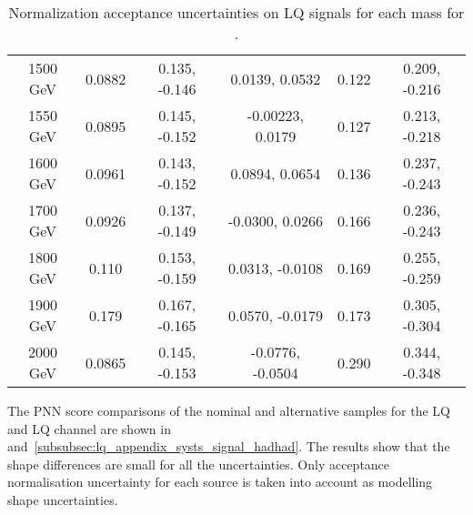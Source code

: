 \begin{table}
\begin{tabular}{|c|c|c|c|c|c|}
1500 GeV & 0.0882 & 0.135, -0.146  &   0.0139,   0.0532 &  0.122 & 0.209, -0.216 \\
1550 GeV & 0.0895 & 0.145, -0.152  & -0.00223,   0.0179 &  0.127 & 0.213, -0.218 \\
1600 GeV & 0.0961 & 0.143, -0.152  &   0.0894,   0.0654 &  0.136 & 0.237, -0.243 \\
1700 GeV & 0.0926 & 0.137, -0.149  &  -0.0300,   0.0266 &  0.166 & 0.236, -0.243 \\
1800 GeV &  0.110 & 0.153, -0.159  &   0.0313,  -0.0108 &  0.169 & 0.255, -0.259 \\
1900 GeV &  0.179 & 0.167, -0.165  &   0.0570,  -0.0179 &  0.173 & 0.305, -0.304 \\
2000 GeV & 0.0865 & 0.145, -0.153  &  -0.0776,  -0.0504 &  0.290 & 0.344, -0.348 \\
\hline
\end{tabular}
\caption{Normalization acceptance uncertainties on LQ signals for each mass for \hadhad.}
\label{sec:systs:tab:systematics_normalisations_LQ_hadhad}
\end{table}

The PNN score comparisons of the nominal and alternative samples for the LQ \lephad and LQ \hadhad channel are shown in~ and~\ref{subsubsec:lq_appendix_systs_signal_hadhad}.
The results show that the shape differences are small for all the uncertainties.
Only acceptance normalisation uncertainty for each source is taken into account as modelling shape uncertainties.



